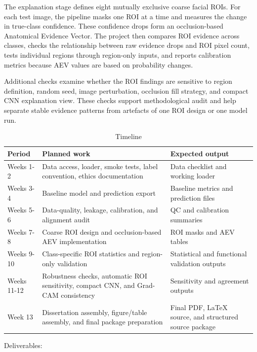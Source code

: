 The explanation stage defines eight mutually exclusive coarse facial ROIs. For each test image, the pipeline masks one ROI at a time and measures the change in true-class confidence. These confidence drops form an occlusion-based Anatomical Evidence Vector. The project then compares ROI evidence across classes, checks the relationship between raw evidence drops and ROI pixel count, tests individual regions through region-only inputs, and reports calibration metrics because AEV values are based on probability changes.


Additional checks examine whether the ROI findings are sensitive to region definition, random seed, image perturbation, occlusion fill strategy, and compact CNN explanation view. These checks support methodological audit and help separate stable evidence patterns from artefacts of one ROI design or one model run.


\begin{table}[htbp]
\centering
\scriptsize
\caption{Timeline}
\begin{tabularx}{\textwidth}{>{\raggedright\arraybackslash}X>{\raggedright\arraybackslash}X>{\raggedright\arraybackslash}X}
\toprule
Period & Planned work & Expected output \\
\midrule
Weeks 1-2 & Data access, loader, smoke tests, label convention, ethics documentation & Data checklist and working loader \\
Weeks 3-4 & Baseline model and prediction export & Baseline metrics and prediction files \\
Weeks 5-6 & Data-quality, leakage, calibration, and alignment audit & QC and calibration summaries \\
Weeks 7-8 & Coarse ROI design and occlusion-based AEV implementation & ROI masks and AEV tables \\
Weeks 9-10 & Class-specific ROI statistics and region-only validation & Statistical and functional validation outputs \\
Weeks 11-12 & Robustness checks, automatic ROI sensitivity, compact CNN, and Grad-CAM consistency & Sensitivity and agreement outputs \\
Week 13 & Dissertation assembly, figure/table assembly, and final package preparation & Final PDF, LaTeX source, and structured source package \\
\bottomrule
\end{tabularx}
\end{table}

Deliverables:


